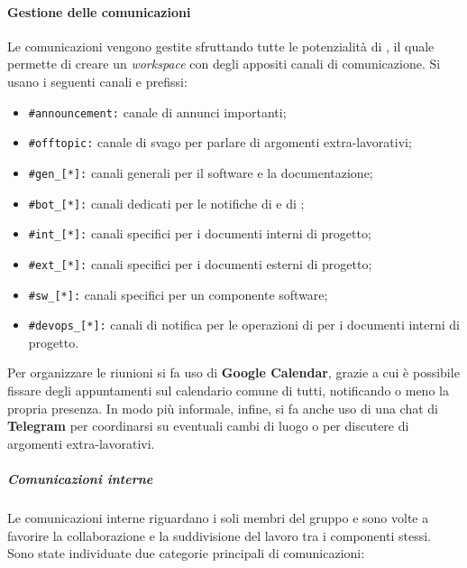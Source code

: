 		
		\paragraph{Gestione delle comunicazioni}

		Le comunicazioni vengono gestite sfruttando tutte le potenzialità di , il quale permette di creare un \textit{workspace} con degli appositi canali di comunicazione. Si usano i seguenti canali e prefissi:
			\begin{itemize}
			  \item \verb!#announcement:! canale di annunci importanti;
			  \item \verb!#offtopic:! canale di svago per parlare di argomenti extra-lavorativi;
			  \item \verb!#gen_[*]:! canali generali per il software e la documentazione;
			  \item \verb!#bot_[*]:! canali dedicati per le notifiche di  e di ;
			  \item \verb!#int_[*]:! canali specifici per i documenti interni di progetto;
			  \item \verb!#ext_[*]:! canali specifici per i documenti esterni di progetto;
			  \item \verb!#sw_[*]:! canali specifici per un componente software;
			  \item \verb!#devops_[*]:! canali di notifica per le operazioni di  per i documenti interni di progetto.
			\end{itemize}
	
		Per organizzare le riunioni si fa uso di \textbf{Google Calendar}, grazie a cui è possibile fissare degli appuntamenti sul calendario comune di tutti, notificando o meno la propria presenza.
		In modo più informale, infine, si fa anche uso di una chat di \textbf{Telegram} per coordinarsi su eventuali cambi di luogo o per discutere di argomenti extra-lavorativi.

		\subparagraph{Comunicazioni interne}

				Le comunicazioni interne riguardano i soli membri del gruppo e sono volte a favorire la collaborazione e la suddivisione del lavoro tra i componenti stessi.
				\newline
				Sono state individuate due categorie principali di comunicazioni:

